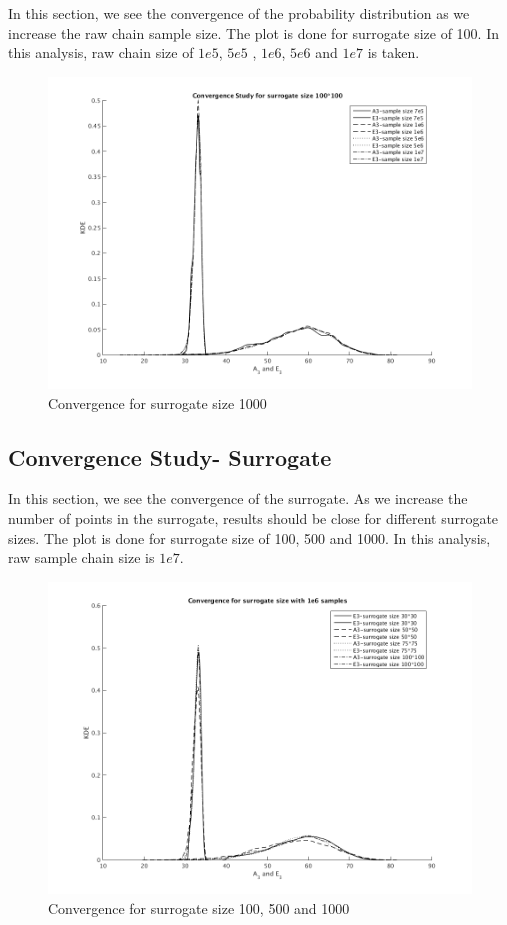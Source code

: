 \noindent In this section, we see the convergence of the probability distribution as we increase the raw chain sample size. The plot is done for surrogate size of 100. In this analysis, raw chain size of $1e5$, $5e5$ , $1e6$, $5e6$ and $1e7$ is taken. 

\begin{figure}[H]
\centering
\includegraphics[scale = 0.7]{model_3/sample_conv} 
    \caption{Convergence for surrogate size 1000}
\end{figure}


\subsection{Convergence Study- Surrogate }

\noindent In this section, we see the convergence of the surrogate. As we increase the number of points in the surrogate, results should be close for different surrogate sizes. The plot is done for surrogate size of 100, 500 and 1000. In this analysis, raw sample chain size is $1e7$. 

\begin{figure}[H]
\centering
\includegraphics[scale=0.7]{model_3/surrogate_conv} 
    \caption{Convergence for surrogate size 100, 500 and 1000}
\end{figure}


